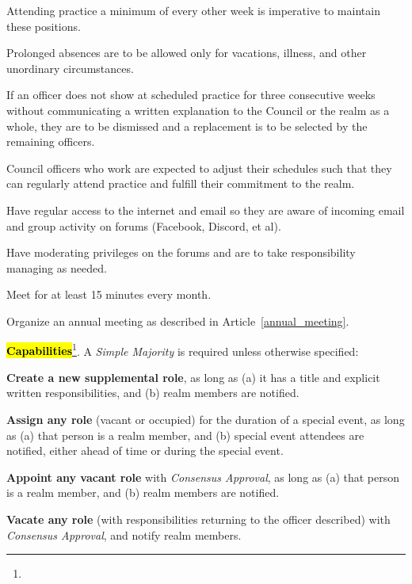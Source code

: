 \documentclass[12pt]{article}
\newcommand{\newpart}[2][]{\hl{#2}\expandafter\ifx\expandafter\relax\detokenize{#1}\relax\else\textnormal{\footnote{#1}}\fi}
\begin{document}
\begin{level}
\begin{level}
\begin{level}
            \begin{level}
                \item Attending practice a minimum of every other week is imperative to maintain these positions. 
                \item Prolonged absences are to be allowed only for vacations, illness, and other unordinary circumstances. 
                \item If an officer does not show at scheduled practice for three consecutive weeks without communicating a written explanation to the Council or the realm as a whole, they are to be dismissed and a replacement is to be selected by the remaining officers. 
                \item Council officers who work are expected to adjust their schedules such that they can regularly attend practice and fulfill their commitment to the realm.
            \end{level}   
            \item Have regular access to the internet and email so they are aware of incoming email and group activity on forums (Facebook, Discord, et al).
            \item Have moderating privileges on the forums and are to take responsibility managing as needed.
            \item Meet for at least 15 minutes every month.
            \item Organize an annual meeting as described in Article~\ref{annual_meeting}.
        \end{level}
        \item \newpart{\textbf{Capabilities}}. A \emph{Simple Majority} is required unless otherwise specified:
        \begin{level}
            \item \textbf{Create a new supplemental role}, as long as (a) it has a title and explicit written responsibilities, and (b) realm members are notified.
            \item \textbf{Assign any role} (vacant or occupied) for the duration of a special event, as long as (a) that person is a realm member, and (b) special event attendees are notified, either ahead of time or during the special event.
            \item \textbf{Appoint any vacant role} with \emph{Consensus Approval}, as long as (a) that person is a realm member, and (b) realm members are notified.
            \item \textbf{Vacate any role} (with responsibilities returning to the officer described) with \emph{Consensus Approval}, and notify realm members.

\end{level}
\end{level}
\end{level}
\end{document}
